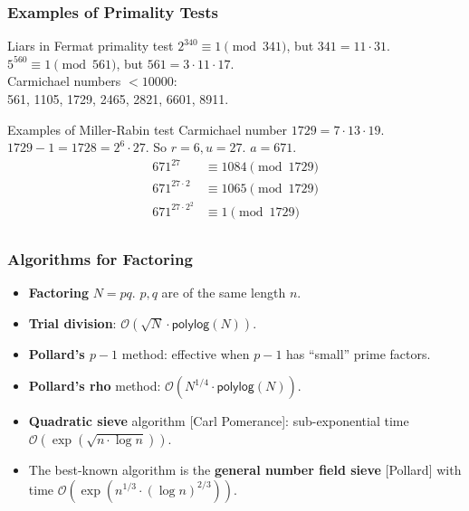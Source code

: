 \begin{frame}\frametitle{Examples of Primality Tests}
\begin{exampleblock}{Liars in Fermat primality test}
$2^{340} \equiv 1 \pmod {341}$,  but $341 = 11\cdot 31$.\\  
$5^{560} \equiv 1 \pmod {561}$,  but $561 = 3\cdot 11\cdot 17$.\\
Carmichael numbers $< 10000$: \\  
561,  1105,  1729,  2465,  2821,  6601,  8911.
\end{exampleblock}
\begin{exampleblock}{Examples of Miller-Rabin test}
Carmichael number $1729=7\cdot 13\cdot 19$. \\$1729-1 = 1728 = 2^6\cdot 27$. So $r = 6, u = 27$. $a=671$.
\begin{align*}
671^{27} &\equiv 1084 \pmod {1729} \\
671^{27\cdot 2} &\equiv 1065 \pmod {1729}\\
671^{27\cdot 2^2} &\equiv 1 \pmod {1729}\\
\end{align*}

\end{exampleblock}
\end{frame}
\begin{frame}\frametitle{Algorithms for Factoring}
\begin{itemize}
\item \textbf{Factoring} $N=pq$. $p,q$ are of the same length $n$.
\item \textbf{Trial division}: $\mathcal{O}(\sqrt{N}\cdot \mathsf{polylog}(N))$.
\item \textbf{Pollard's $p-1$} method: effective when $p-1$ has ``small'' prime factors.
\item \textbf{Pollard's rho} method: $\mathcal{O}(N^{1/4}\cdot \mathsf{polylog}(N))$.
\item \textbf{Quadratic sieve} algorithm [Carl Pomerance]: sub-exponential time $\mathcal{O}(\exp(\sqrt{n\cdot \log n}))$.
\item The best-known algorithm is the \textbf{general number field sieve} [Pollard] with time $\mathcal{O}(\exp(n^{1/3}\cdot(\log n)^{2/3}))$.
\end{itemize}
\end{frame}
